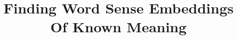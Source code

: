 \documentclass{article} %
\providecommand{\DIFdelbegin}{} %
\providecommand{\DIFdelend}{} %
\begin{document}
\title{Finding Word Sense Embeddings Of Known Meaning}


\DIFdelbegin %

\DIFdelend \maketitle
\end{document}
